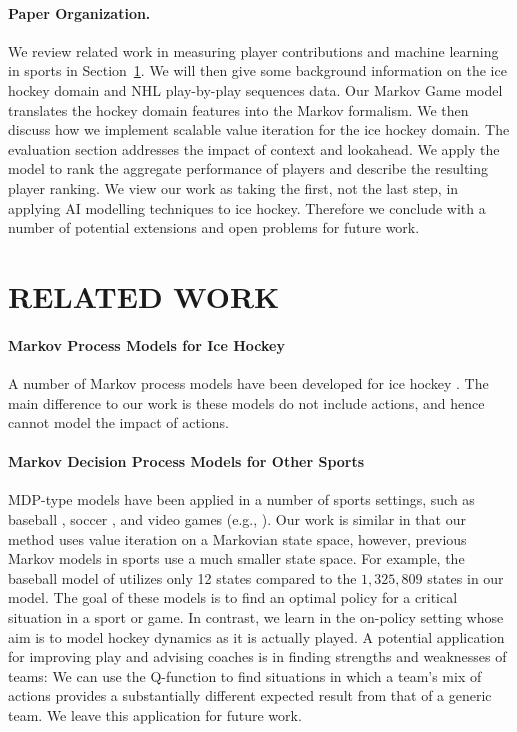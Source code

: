 \documentclass[]{article}
\begin{document}
\paragraph{Paper Organization.}

We review related work in measuring player contributions and machine learning in sports in Section~\ref{sec:related-work}. We will then give some background information on the ice hockey domain and NHL play-by-play sequences data. Our Markov Game model translates the hockey domain features into the Markov formalism. We then discuss how we implement scalable value iteration for the ice hockey domain. The evaluation section addresses the impact of context and lookahead.
We apply the model to rank the aggregate performance of players and describe the resulting player ranking. We view our work as taking the first, not the last step, in applying AI modelling techniques to ice hockey. Therefore we conclude with a number of potential extensions and open problems for future work.


\section{RELATED WORK}
\label{sec:related-work}

\paragraph{Markov Process Models for Ice Hockey} A number of Markov process models have been developed for ice hockey \citep{Thomas2013,Buttrey2011}. The main difference to our work is these models do not include actions, and hence cannot model the impact of actions.


\paragraph{Markov Decision Process Models for Other Sports} MDP-type models have been applied in a number of sports settings, such as baseball
\citep{Sidhu2014}, soccer \citep{Hirotsu2002}, and video games (e.g., \citep{Churchill2013}). Our work is similar in that our method uses value iteration on a Markovian state space, however, previous Markov models in sports use a much smaller state space. For example, the baseball model of \citep{Sidhu2014} utilizes only 12 states compared to the $1,325,809$ states in our model. The goal of these models is to find an optimal policy for a critical situation in a sport or game. In contrast, we learn in the on-policy setting whose aim is to model hockey dynamics as it is actually played. A potential application for improving play and advising coaches is in finding strengths and weaknesses of teams: We can use the Q-function to find situations in which a team's mix of actions provides a substantially different expected result from that of a generic team. We leave this application for future work.
\end{document}
